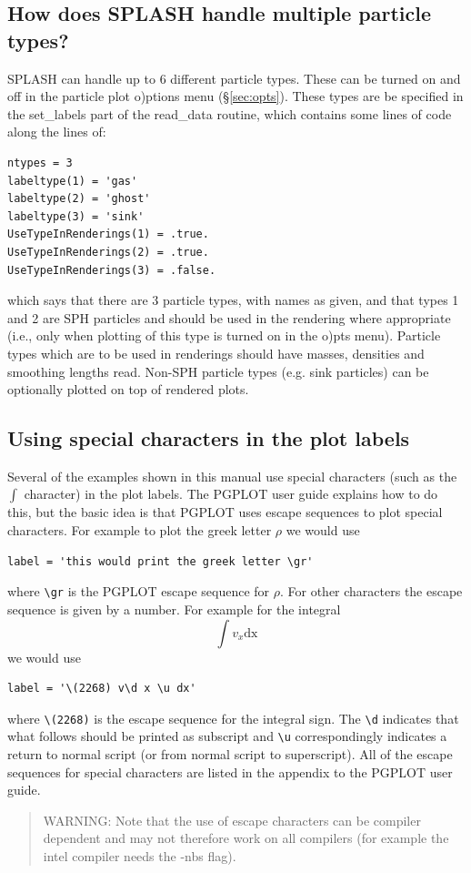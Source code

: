 \documentclass[a4paper,10pt]{article}
\newcommand{\splash}{\textsc{SPLASH }}
\begin{document}
\subsection{How does \splash handle multiple particle types?}
\splash can handle up to 6 different particle types. These can be turned on and off in the particle plot
o)ptions menu (\S\ref{sec:opts}). These types are be specified in the set\_labels part of the read\_data
routine, which contains some lines of code along the lines of:
\begin{verbatim}
ntypes = 3
labeltype(1) = 'gas'
labeltype(2) = 'ghost'
labeltype(3) = 'sink'
UseTypeInRenderings(1) = .true.
UseTypeInRenderings(2) = .true.
UseTypeInRenderings(3) = .false.
\end{verbatim}
which says that there are 3 particle types, with names as given, and that types 1 and 2 are SPH particles and
should be used in the rendering where appropriate (i.e., only when plotting of this type is turned on in the
o)pts menu). Particle types which are to be used in renderings should have masses, densities and smoothing
lengths read. Non-SPH particle types (e.g. sink particles) can be optionally plotted on top of rendered plots.

\subsection{Using special characters in the plot labels}
 Several of the examples shown in this manual use special characters (such as
the $\int$ character) in the plot labels. The PGPLOT user guide explains how to do
this, but the basic idea is that PGPLOT uses escape sequences to plot special
characters. For example to plot the greek letter $\rho$ we would use
\begin{verbatim}
label = 'this would print the greek letter \gr'
\end{verbatim}
where \verb+\gr+ is the PGPLOT escape sequence for $\rho$. For other
characters the escape sequence is given by a number. For example for the integral 
\begin{equation}
\int v_x \mathrm{dx}
\end{equation}
we would use
\begin{verbatim}
label = '\(2268) v\d x \u dx'
\end{verbatim}
where \verb+\(2268)+ is the escape sequence for the integral sign. The
\verb+\d+ indicates that what follows should be printed as subscript and
\verb+\u+ correspondingly indicates a return to normal script (or from normal script to
superscript). All of the escape sequences for special characters are listed in
the appendix to the PGPLOT user guide.
\begin{quote}
 WARNING: Note that the use of escape characters can be compiler dependent and
 may not therefore work on all compilers (for example the intel compiler needs
 the -nbs flag).
\end{quote}
\end{document}
